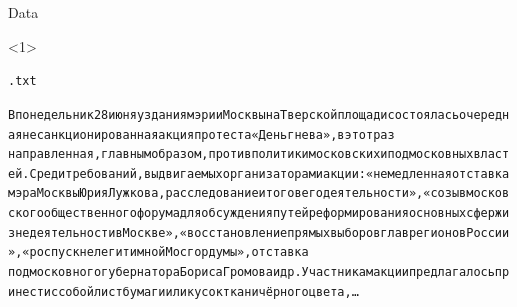 \documentclass[10pt, compress]{beamer}
\begin{document}
\begin{frame}{Data}

\begin{onlyenv}<1>
\begin{center}
\texttt{.txt}
\end{center}
{\small 
\begin{alltt}
В понедельник 28 июня у здания мэрии Москвы на Тверской площади состоялась очередная несанкционированная акция протеста «День гнева», в этот раз \\
направленная, главным образом, против политики московских и подмосковных властей. Среди требований, выдвигаемых организаторами акции: «немедленная отставка мэра Москвы Юрия Лужкова, расследование итогов его деятельности», «созыв московского общественного форума для обсуждения путей реформирования основных сфер жизнедеятельности в Москве», «восстановление прямых выборов глав регионов России», «роспуск нелегитимной Мосгордумы», отставка \\
подмосковного губернатора Бориса Громова и др. Участникам акции предлагалось принести с собой лист бумаги или кусок ткани чёрного цвета, \ldots
\end{alltt}
}


\end{onlyenv}
\end{frame}
\end{document}

